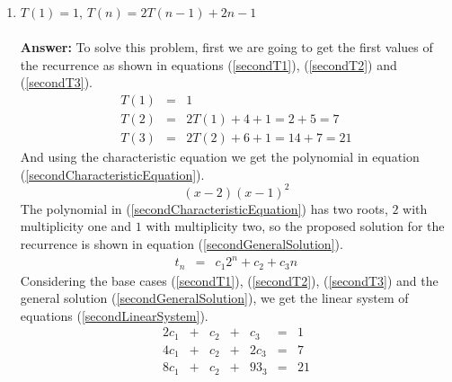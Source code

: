 \documentclass[12pt]{scrartcl}
\begin{document}
\begin{enumerate}
\begin{enumerate}
			\item $T(1) = 1$, $T(n) = 2T(n - 1) + 2n - 1$\\
			\\
			\textbf{Answer: }
			To solve this problem, first we are going to get the first values of the recurrence as shown in equations (\ref{secondT1}), (\ref{secondT2}) and (\ref{secondT3}).
			\begin{eqnarray}
			T(1)	&	=	&	1 \label{secondT1}\\
			T(2)	&	=	&	2T(1) + 4 + 1 = 2 + 5 =  7\label{secondT2}\\
			T(3)	&	=	&	2T(2) + 6 + 1 = 14 + 7 = 21\label{secondT3}
			\end{eqnarray}
			And using the characteristic equation we get the polynomial in equation (\ref{secondCharacteristicEquation}).
			\begin{equation}\label{secondCharacteristicEquation}
				(x-2)(x - 1)^2
			\end{equation}
			The polynomial in (\ref{secondCharacteristicEquation}) has two roots, $2$ with multiplicity one and $1$ with multiplicity two, so the proposed solution for the recurrence is shown in equation (\ref{secondGeneralSolution}).
			\begin{eqnarray}\label{secondGeneralSolution}
				t_n 	&	=	&	c_1 2^n + c_2 + c_3 n
			\end{eqnarray}
			Considering the base cases (\ref{secondT1}), (\ref{secondT2}), (\ref{secondT3}) and the general solution (\ref{secondGeneralSolution}), we get the linear system of equations (\ref{secondLinearSystem}).
				\begin{equation}\label{secondLinearSystem}
				\begin{array}{ccccccc}
					2c_1	&	+	&	c_2	&	+	&	c_3		&	=	&	1 \\
					4c_1	&	+	&	c_2	&	+	&	2c_3	&	=	&	7 \\
					8c_1	&	+	&	c_2	&	+	&	93_3	&	=	&	21 \\
				\end{array}
			\end{equation}
			

\end{enumerate}
\end{enumerate}
\end{document}
